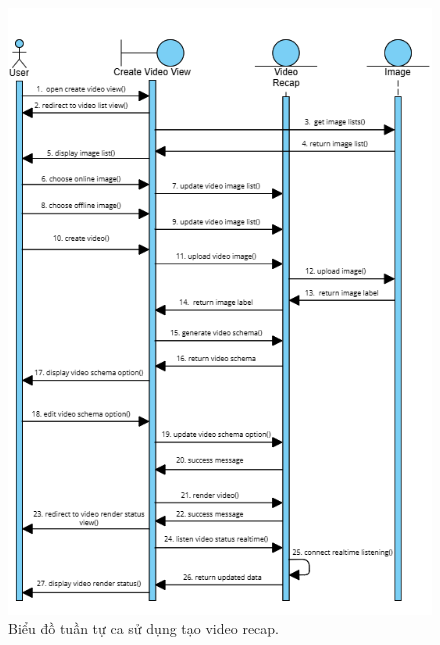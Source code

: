 \begin{figure}[H]
    \centering  
    \includegraphics[width=1\textwidth]{figures/c3/3-3-9-sequence-diagram.png}
    \caption{Biểu đồ tuần tự ca sử dụng tạo video recap.}
    \label{fig:3-3-9-sequence-diagram}
\end{figure}
